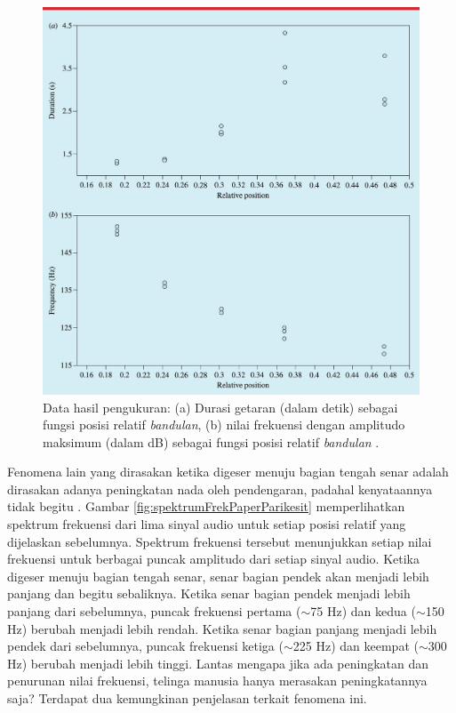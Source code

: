 \begin{figure}[t!]
    \centering
    \includegraphics[width=13cm]{Gambar/highSpeedRecordData.jpg}
    \caption{Data hasil pengukuran: (a) Durasi getaran (dalam detik) sebagai fungsi posisi relatif \textit{bandulan}, (b) nilai frekuensi dengan amplitudo maksimum (dalam dB) sebagai fungsi posisi relatif \textit{bandulan} \cite{illusiveSound}.}
    \label{fig:DataHighSpeed}
\end{figure}   
Fenomena lain yang dirasakan ketika \bandulan digeser menuju bagian tengah senar adalah dirasakan adanya peningkatan nada oleh pendengaran, padahal kenyataannya tidak begitu \cite{illusiveSound}. Gambar \ref{fig:spektrumFrekPaperParikesit} memperlihatkan spektrum frekuensi dari lima sinyal audio untuk setiap posisi relatif \bandulan yang dijelaskan sebelumnya. Spektrum frekuensi tersebut menunjukkan setiap nilai frekuensi untuk berbagai puncak amplitudo dari setiap sinyal audio. Ketika \bandulan digeser menuju bagian tengah senar, senar bagian pendek akan menjadi lebih panjang dan begitu sebaliknya. Ketika senar bagian pendek menjadi lebih panjang dari sebelumnya, puncak frekuensi pertama ($\sim$75 Hz) dan kedua ($\sim$150 Hz) berubah menjadi lebih rendah. Ketika senar bagian panjang menjadi lebih pendek dari sebelumnya, puncak frekuensi ketiga ($\sim$225 Hz) dan keempat ($\sim$300 Hz) berubah menjadi lebih tinggi. Lantas mengapa jika ada peningkatan dan penurunan nilai frekuensi, telinga manusia hanya merasakan peningkatannya saja? Terdapat dua kemungkinan penjelasan terkait fenomena ini. 
